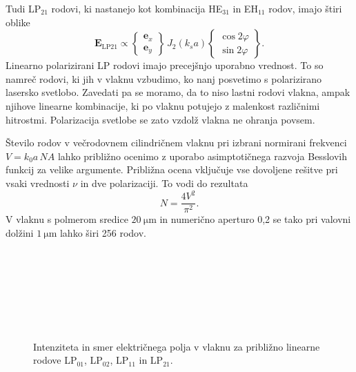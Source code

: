 Tudi LP$_{21}$ rodovi, ki nastanejo kot kombinacija HE$_{31}$
in EH$_{11}$ rodov, imajo štiri oblike
\begin{equation}
\mathbf{E}_\mathrm{LP21} \propto \left \{
  \begin{matrix}
  \mathbf{e}_x \\ \mathbf{e}_y 
  \end{matrix}
\right \} \, J_2(k_s a)
\left \{
  \begin{matrix}
  \cos 2 \varphi  \\ \sin 2 \varphi 
  \end{matrix}
\right \}.
\end{equation}
Linearno polarizirani LP rodovi imajo precejšnjo uporabno vrednost. To so 
namreč rodovi, ki jih v vlaknu vzbudimo, ko nanj posvetimo s polarizirano 
lasersko svetlobo. Zavedati pa se moramo, da to niso lastni rodovi vlakna, 
ampak njihove linearne kombinacije, ki po vlaknu potujejo z malenkost različnimi
hitrostmi. Polarizacija svetlobe se zato vzdolž vlakna ne ohranja povsem.
\begin{remark}
Število rodov v večrodovnem cilindričnem vlaknu pri izbrani normirani 
frekvenci $V = k_0a\, NA$ lahko približno ocenimo z uporabo asimptotičnega 
razvoja Besslovih funkcij za velike argumente. Približna ocena vključuje 
vse dovoljene rešitve pri vsaki vrednosti $\nu$ in dve polarizaciji. 
To vodi do rezultata
\begin{equation} 
N = \frac{4 V^2}{\pi^2}.
\end{equation}
V vlaknu s polmerom sredice $20~\si{\micro\meter}$ in numerično aperturo 0,2
se tako pri valovni dolžini $1~\si{\micro\meter}$ lahko širi 256 rodov. 
\end{remark}
\begin{figure}[h!]
\centering
\def\svgwidth{93truemm} 
 \\
\def\svgwidth{93truemm} 
 \\
\def\svgwidth{93truemm} 
 \\
\def\svgwidth{93truemm} 
 \\
\def\svgwidth{93truemm} 
 \\
\def\svgwidth{93truemm} 
 \\
\caption{Intenziteta in smer električnega polja v vlaknu za približno linearne rodove
LP$_{01}$, LP$_{02}$, LP$_{11}$ in LP$_{21}$.}
\label{fig:LP}
\end{figure}

